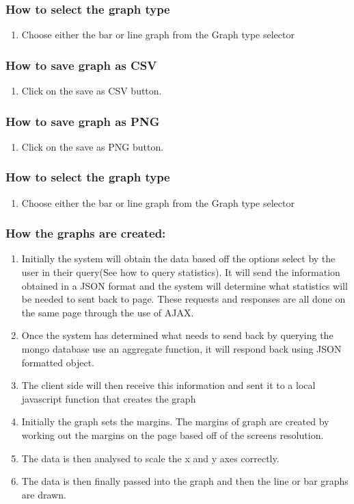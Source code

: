 \documentclass[14pt, a4paper]{article}
\begin{document}
	\subsubsection{How to select the graph type}
		\begin{enumerate}
			\item Choose either the bar or line graph from the Graph type selector
		\end{enumerate}
	\subsubsection{How to save graph as CSV}
		\begin{enumerate}
			\item Click on the save as CSV button.
		\end{enumerate}
	\subsubsection{How to save graph as PNG}
		\begin{enumerate}
			\item Click on the save as PNG button.
		\end{enumerate}
	\subsubsection{How to select the graph type}
		\begin{enumerate}
			\item Choose either the bar or line graph from the Graph type selector
		\end{enumerate}
	\subsubsection{How the graphs are created:}
		\begin{enumerate}
			\item Initially the system will obtain the data based off the options select by the user in their query(See how to query statistics). It will send the information obtained in a JSON format and the system will determine what statistics will be needed to sent back to page. These requests and responses are all done on the same page through the use of AJAX.
			\item Once the system has determined what needs to send back by querying the mongo database use an aggregate function, it will respond back using JSON formatted object.
			\item The client side will then receive this information and sent it to a local javascript function that creates the graph
			\item Initially the graph sets the margins. The margins of graph are created by working out the margins on the page based off of the screens resolution.
			\item The data is then analysed to scale the x and y axes correctly.
			\item The data is then finally passed into the graph and then the line or bar graphs are drawn.
		\end{enumerate}
\end{document}
